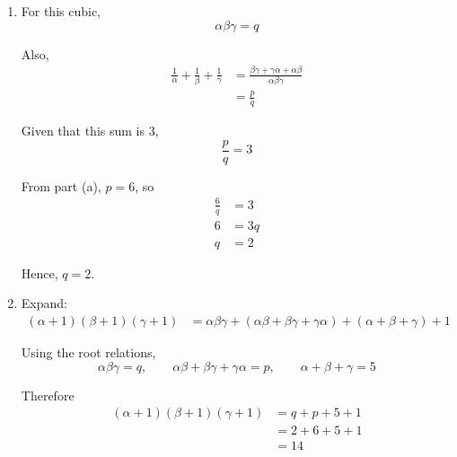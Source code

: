 \documentclass[leqno]{article}
\begin{document}
\begin{enumerate}[
  label=\textbf{\arabic*.},
  leftmargin=*,
  topsep=0pt,
  partopsep=0pt,
  parsep=0pt
]
\begin{tcolorbox}[colback=white, colframe=scarlet, title={\textbf{Solution}}, breakable, grow to left by=6mm, grow to right by=10mm]
\begin{enumerate}[label=\textbf{(\alph*)}]
  Also,
  \[
  \alpha^2+\beta^2+\gamma^2=(\alpha+\beta+\gamma)^2-2(\alpha\beta+\beta\gamma+\gamma\alpha)
  \]

  So
  \begin{align*}
  (\alpha-\beta)^2+(\beta-\gamma)^2+(\gamma-\alpha)^2
  &=2\big((\alpha+\beta+\gamma)^2-2(\alpha\beta+\beta\gamma+\gamma\alpha)\big)-2(\alpha\beta+\beta\gamma+\gamma\alpha) \\
  &=2\big((\alpha+\beta+\gamma)^2-3(\alpha\beta+\beta\gamma+\gamma\alpha)\big)
  \end{align*}

  Substituting the known values,
  \begin{align*}
  14&=2(5^2-3p) \\
  14&=2(25-3p) \\
  7&=25-3p \\
  3p&=18 \\
  p&=6
  \end{align*}

  Hence, $p=6$.

  \item For this cubic,
  \[
  \alpha\beta\gamma=q
  \]

  Also,
  \begin{align*}
  \frac{1}{\alpha}+\frac{1}{\beta}+\frac{1}{\gamma}
  &=\frac{\beta\gamma+\gamma\alpha+\alpha\beta}{\alpha\beta\gamma} \\
  &=\frac{p}{q}
  \end{align*}

  Given that this sum is $3$,
  \[
  \frac{p}{q}=3
  \]

  From part (a), $p=6$, so
  \begin{align*}
  \frac{6}{q}&=3 \\
  6&=3q \\
  q&=2
  \end{align*}

  Hence, $q=2$.

  \item Expand:
  \begin{align*}
  (\alpha+1)(\beta+1)(\gamma+1)
  &=\alpha\beta\gamma+(\alpha\beta+\beta\gamma+\gamma\alpha)+(\alpha+\beta+\gamma)+1
  \end{align*}

  Using the root relations,
  \[
  \alpha\beta\gamma=q,\qquad
  \alpha\beta+\beta\gamma+\gamma\alpha=p,\qquad
  \alpha+\beta+\gamma=5
  \]

  Therefore
  \begin{align*}
  (\alpha+1)(\beta+1)(\gamma+1)
  &=q+p+5+1 \\
  &=2+6+5+1 \\
  &=14
  \end{align*}


\end{enumerate}
\end{tcolorbox}
\end{enumerate}
\end{document}
